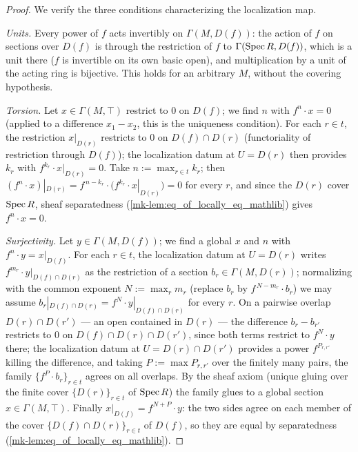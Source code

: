 \begin{proof}
  \leanok
  We verify the three conditions characterizing the localization map.

  \emph{Units.} Every power of \(f\) acts invertibly on \(\Gamma(M, D(f))\): the action
  of \(f\) on sections over \(D(f)\) is through the restriction of \(f\) to
  \(\Gamma(\operatorname{Spec} R, D(f))\), which is a unit there (\(f\) is invertible on its own basic
  open), and multiplication by a unit of the acting ring is bijective. This holds for an
  arbitrary \(M\), without the covering hypothesis.

  \emph{Torsion.} Let \(x \in \Gamma(M, \top)\) restrict to \(0\) on \(D(f)\); we find
  \(n\) with \(f^n \cdot x = 0\) (applied to a difference \(x_1 - x_2\), this is the
  uniqueness condition). For each \(r \in t\), the restriction \(x|_{D(r)}\) restricts to
  \(0\) on \(D(f) \cap D(r)\) (functoriality of restriction through \(D(f)\)); the
  localization datum at \(U = D(r)\) then provides \(k_r\) with
  \(f^{k_r} \cdot x|_{D(r)} = 0\). Take \(n := \max_{r \in t} k_r\); then
  \((f^n \cdot x)|_{D(r)} = f^{\,n-k_r} \cdot \bigl(f^{k_r} \cdot x|_{D(r)}\bigr) = 0\)
  for every \(r\), and since the \(D(r)\) cover \(\operatorname{Spec} R\), sheaf separatedness
  (\ref{mk-lem:eq_of_locally_eq_mathlib}) gives \(f^n \cdot x = 0\).

  \emph{Surjectivity.} Let \(y \in \Gamma(M, D(f))\); we find a global \(x\) and \(n\)
  with \(f^n \cdot y = x|_{D(f)}\). For each \(r \in t\), the localization datum at
  \(U = D(r)\) writes \(f^{m_r} \cdot y|_{D(f) \cap D(r)}\) as the restriction of a
  section \(b_r \in \Gamma(M, D(r))\); normalizing with the common exponent
  \(N := \max_r m_r\) (replace \(b_r\) by \(f^{\,N-m_r} \cdot b_r\)) we may assume
  \(b_r|_{D(f) \cap D(r)} = f^{N} \cdot y|_{D(f) \cap D(r)}\) for every \(r\). On a
  pairwise overlap \(D(r) \cap D(r')\) — an open contained in \(D(r)\) — the difference
  \(b_r - b_{r'}\) restricts to \(0\) on \(D(f) \cap D(r) \cap D(r')\), since both terms
  restrict to \(f^N \cdot y\) there; the localization datum at
  \(U = D(r) \cap D(r')\) provides a power \(f^{P_{r,r'}}\) killing the difference, and
  taking \(P := \max P_{r,r'}\) over the finitely many pairs, the family
  \(\{f^P \cdot b_r\}_{r \in t}\) agrees on all overlaps. By the sheaf axiom (unique
  gluing over the finite cover \(\{D(r)\}_{r \in t}\) of \(\operatorname{Spec} R\)) the family glues to
  a global section \(x \in \Gamma(M, \top)\). Finally
  \(x|_{D(f)} = f^{N+P} \cdot y\): the two sides agree on each member of the cover
  \(\{D(f) \cap D(r)\}_{r \in t}\) of \(D(f)\), so they are equal by separatedness
  (\ref{mk-lem:eq_of_locally_eq_mathlib}).
\end{proof}

